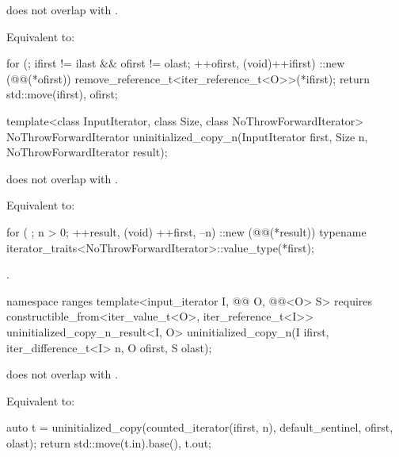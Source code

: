 \begin{itemdescr}
\pnum
\expects
{} does not overlap with .

\pnum
\effects
Equivalent to:
\begin{codeblock}
for (; ifirst != ilast && ofirst != olast; ++ofirst, (void)++ifirst) {
  ::new (@@(*ofirst)) remove_reference_t<iter_reference_t<O>>(*ifirst);
}
return {std::move(ifirst), ofirst};
\end{codeblock}
\end{itemdescr}

%
\begin{itemdecl}
template<class InputIterator, class Size, class NoThrowForwardIterator>
  NoThrowForwardIterator uninitialized_copy_n(InputIterator first, Size n,
                                              NoThrowForwardIterator result);
\end{itemdecl}

\begin{itemdescr}
\pnum
\expects
{} does not overlap with .

\pnum
\effects
Equivalent to:
\begin{codeblock}
for ( ; n > 0; ++result, (void) ++first, --n) {
  ::new (@@(*result))
    typename iterator_traits<NoThrowForwardIterator>::value_type(*first);
}
\end{codeblock}

\pnum
\returns
{}.
\end{itemdescr}

%
\begin{itemdecl}
namespace ranges {
  template<input_iterator I, @@ O, @@<O> S>
      requires constructible_from<iter_value_t<O>, iter_reference_t<I>>
    uninitialized_copy_n_result<I, O>
      uninitialized_copy_n(I ifirst, iter_difference_t<I> n, O ofirst, S olast);
}
\end{itemdecl}

\begin{itemdescr}
\pnum
\expects
{} does not overlap with
.

\pnum
\effects
Equivalent to:
\begin{codeblock}
auto t = uninitialized_copy(counted_iterator(ifirst, n),
                            default_sentinel, ofirst, olast);
return {std::move(t.in).base(), t.out};
\end{codeblock}
\end{itemdescr}

